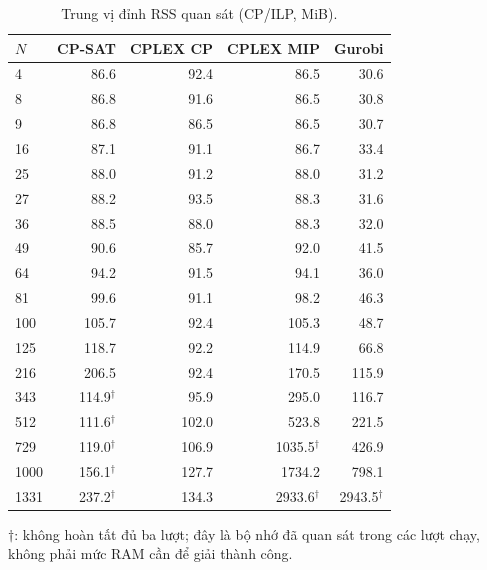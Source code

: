 \begin{table}[pos=H]
\centering
\small
\caption{Trung vị đỉnh RSS quan sát (CP/ILP, MiB).}
\label{tab:native_ram}
\setlength{\tabcolsep}{4pt}
\begin{tabular}{@{}lrrrr@{}}
\toprule
$N$ & CP-SAT & CPLEX CP & CPLEX MIP & Gurobi \\
\midrule
4 & 86.6 & 92.4 & 86.5 & 30.6 \\
8 & 86.8 & 91.6 & 86.5 & 30.8 \\
9 & 86.8 & 86.5 & 86.5 & 30.7 \\
16 & 87.1 & 91.1 & 86.7 & 33.4 \\
25 & 88.0 & 91.2 & 88.0 & 31.2 \\
27 & 88.2 & 93.5 & 88.3 & 31.6 \\
36 & 88.5 & 88.0 & 88.3 & 32.0 \\
49 & 90.6 & 85.7 & 92.0 & 41.5 \\
64 & 94.2 & 91.5 & 94.1 & 36.0 \\
81 & 99.6 & 91.1 & 98.2 & 46.3 \\
100 & 105.7 & 92.4 & 105.3 & 48.7 \\
125 & 118.7 & 92.2 & 114.9 & 66.8 \\
216 & 206.5 & 92.4 & 170.5 & 115.9 \\
343 & 114.9$^{\dagger}$ & 95.9 & 295.0 & 116.7 \\
512 & 111.6$^{\dagger}$ & 102.0 & 523.8 & 221.5 \\
729 & 119.0$^{\dagger}$ & 106.9 & 1035.5$^{\dagger}$ & 426.9 \\
1000 & 156.1$^{\dagger}$ & 127.7 & 1734.2 & 798.1 \\
1331 & 237.2$^{\dagger}$ & 134.3 & 2933.6$^{\dagger}$ & 2943.5$^{\dagger}$ \\
\bottomrule
\end{tabular}
\par\smallskip\begin{minipage}{\linewidth}\footnotesize $\dagger$: không hoàn tất đủ ba lượt; đây là bộ nhớ đã quan sát trong các lượt chạy, không phải mức RAM cần để giải thành công.\end{minipage}
\end{table}
